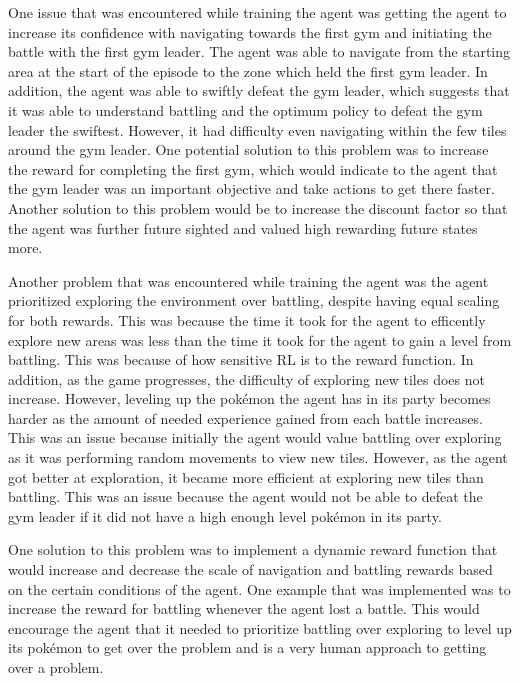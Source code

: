 One issue that was encountered while training the agent was getting the agent to increase its confidence with navigating towards the first gym and initiating the battle with the first gym leader. The agent was able to navigate from the starting area at the start of the episode to the zone which held the first gym leader. In addition, the agent was able to swiftly defeat the gym leader, which suggests that it was able to understand battling and the optimum policy to defeat the gym leader the swiftest. However, it had difficulty even navigating within the few tiles around the gym leader. One potential solution to this problem was to increase the reward for completing the first gym, which would indicate to the agent that the gym leader was an important objective and take actions to get there faster. Another solution to this problem would be to increase the discount factor so that the agent was further future sighted and valued high rewarding future states more. 

Another problem that was encountered while training the agent was the agent prioritized exploring the environment over battling, despite having equal scaling for both rewards. This was because the time it took for the agent to efficently explore new areas was less than the time it took for the agent to gain a level from battling. This was because of how sensitive RL is to the reward function. In addition, as the game progresses, the difficulty of exploring new tiles does not increase. However, leveling up the pokémon the agent has in its party becomes harder as the amount of needed experience gained from each battle increases. This was an issue because initially the agent would value battling over exploring as it was performing random movements to view new tiles. However, as the agent got better at exploration, it became more efficient at exploring new tiles than battling. This was an issue because the agent would not be able to defeat the gym leader if it did not have a high enough level pokémon in its party. 

One solution to this problem was to implement a dynamic reward function that would increase and decrease the scale of navigation and battling rewards based on the certain conditions of the agent. One example that was implemented was to increase the reward for battling whenever the agent lost a battle. This would encourage the agent that it needed to prioritize battling over exploring to level up its pokémon to get over the problem and is a very human approach to getting over a problem. 

